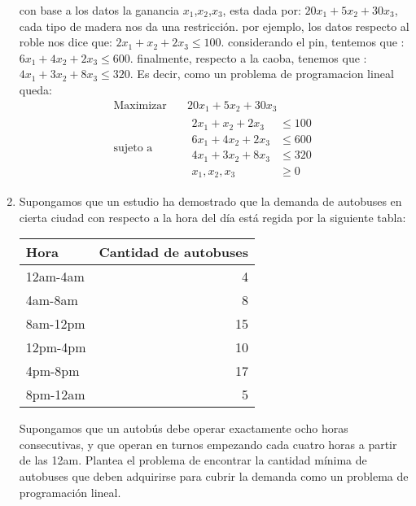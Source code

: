 \documentclass[twocolumn]{article}
\begin{document}
\begin{enumerate}
con base a los datos la ganancia $x _1$,$x _2$,$ x _3$, 
esta dada  por: $20x _1+5x _2+30x _3$, cada tipo de madera nos da una
restricción. por ejemplo, los datos respecto al roble  nos dice que:
$2x _1+x _2+2x _3\leq 100$. considerando el pin, tentemos que :
$6x _1+4x _2+2x _3\leq 600$. finalmente, respecto a la caoba,
tenemos que :$4x _1+3x _2+8x _3\leq 320$.
Es decir, como un problema de programacion lineal queda:
\begin{equation*}
 \begin{aligned}
\text{Maximizar} \quad & 20x_{1}+5x_{2}+30x_{3}\\
\text{sujeto a} \quad &
  \begin{aligned}
    2x_{1}+x_{2}+2x_{3} &\leq 100\\
    6x_{1}+4x_{2}+2x_{3} &\leq 600\\
    4x_{1}+3x_{2}+8x_{3} &\leq 320\\
     x_{1},x_{2},x_{3} &\geq 0
  \end{aligned}
\end{aligned}
\end{equation*}

\item Supongamos que un estudio ha demostrado que la demanda de autobuses
en cierta ciudad con respecto a la hora del día está regida por la
siguiente tabla:
\begin{center}
\begin{tabular}{lr}
Hora & Cantidad de autobuses\\
\hline
12am-4am & 4\\
4am-8am & 8\\
8am-12pm & 15\\
12pm-4pm & 10\\
4pm-8pm & 17\\
8pm-12am & 5\\
\end{tabular}
\end{center}
Supongamos que un autobús debe operar exactamente ocho horas
consecutivas, y que operan en turnos empezando cada cuatro horas a
partir de las 12am. Plantea el problema de encontrar la cantidad
mínima de autobuses que deben adquirirse para cubrir la
demanda como un problema de programación lineal.
\end{enumerate}
\end{document}
